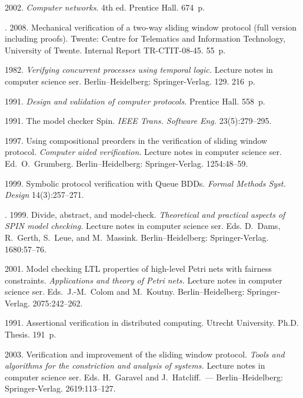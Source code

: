 \begin{multicols}{2}
{{\begin{thebibliography}{99}
 2002.
\textit{Computer networks}. 4th ed.
Prentice Hall. 674~p.

.
2008. Mechanical verification of a two-way sliding window protocol
(full version including proofs). Twente:
Centre for Telematics and
Information Technology, University of Twente. Internal Report TR-CTIT-08-45.
55~p.

1982. \textit{Verifying concurrent processes using temporal logic.}
{Lecture notes in computer science ser.}
Berlin--Heidelberg: Springer-Verlag. 129. 216~p.

 1991.
\textit{Design and validation of computer protocols.} Prentice Hall. 558~p.

1991. The model checker Spin.
\textit{IEEE Trans. Software Eng.} 23(5):279--295.

 1997.
{Using compositional preorders in the verification of sliding window
protocol}. \textit{Computer aided verification}.
Lecture notes in computer science ser. Ed.\ O.~Grumberg.
Berlin--Heidelberg: Springer-Verlag.
1254:48--59.

1999. Symbolic protocol verification with Queue BDDs.
\textit{Formal Methods Syst. Design} 14(3):257--271.

.
1999. Divide, abstract, and model-check.
\textit{Theoretical and practical aspects of SPIN model checking.}
{Lecture notes in computer science ser.}
Eds. D.~Dams, R.~Gerth, S.~Leue, and M.~Massink. Berlin--Heidelberg:
Springer-Verlag. 1680:57--76.

2001. Model checking LTL properties of
high-level Petri nets with fairness
constraints. \textit{Applications and theory of Petri nets.}
{Lecture notes in computer science ser.} Eds.\
J.-M.~Colom and M.~Koutny. Berlin--Heidelberg: Springer-Verlag. 2075:242--262.

1991. Assertional verification in distributed computing.
 Utrecht University. Ph.D. Thesis. 191~p.

 \pagebreak

2003. Verification and improvement
of the sliding window protocol. \textit{Tools and algorithms for
the constriction and analysis of systems.}
{Lecture notes in computer science ser.}
Eds. H.~Garavel and J.~Hatcliff.~--- Berlin--Heidelberg: Springer-Verlag.
2619:113--127.


\end{thebibliography}}}
\end{multicols}
